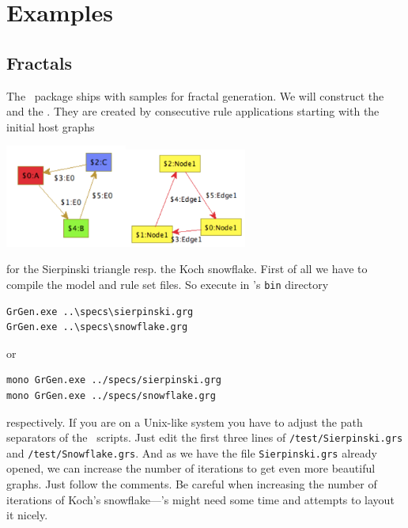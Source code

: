 \chapter{Examples}
\label{anexample}

\section{Fractals}
\label{fractals}
The \GrG\ package ships with samples for fractal generation. We will construct the  and the . They are created by consecutive rule applications starting with the initial host graphs
\begin{center}
\includegraphics[width=4cm]{fig/startsir}\quad\quad\includegraphics[width=4cm]{fig/startkoch}
\end{center}
for the Sierpinski triangle resp. the Koch snowflake. 
First of all we have to compile the model and rule set files. So execute in \GrG's \texttt{bin} directory
\begin{verbatim}
GrGen.exe ..\specs\sierpinski.grg
GrGen.exe ..\specs\snowflake.grg
\end{verbatim}
or
\begin{verbatim}
mono GrGen.exe ../specs/sierpinski.grg
mono GrGen.exe ../specs/snowflake.grg
\end{verbatim}
respectively. If you are on a Unix-like system you have to adjust the path separators of the \GrShell\ scripts. Just edit the first three lines of \texttt{/test/Sierpinski.grs} and \texttt{/test/Snowflake.grs}. And as we have the file \texttt{Sierpinski.grs} already opened, we can increase the number of iterations to get even more beautiful graphs. Just follow the comments. Be careful when increasing the number of iterations of Koch's snowflake---\yComp's  might need some time and attempts to layout it nicely.
